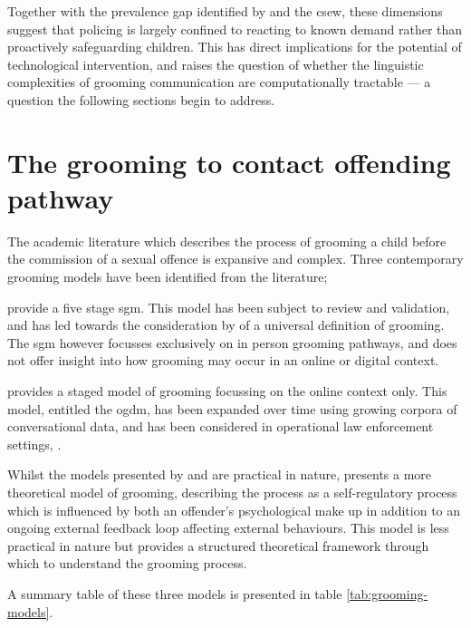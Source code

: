\documentclass[12pt,a4paper,oneside]{report}
\begin{document}
Together with the prevalence gap identified by \citet{finkelhor2024prevalence} and the \gls{csew}, these dimensions suggest that policing is largely confined to reacting to known demand rather than proactively safeguarding children. This has direct implications for the potential of technological intervention, and raises the question of whether the linguistic complexities of grooming communication are computationally tractable — a question the following sections begin to address.

\section{The grooming to contact offending pathway}
\label{sec:the-grooming-to-contact-offending-pathway}
The academic literature which describes the process of grooming a child before the commission of a sexual offence is expansive and complex.  Three contemporary grooming models have been identified from the literature;

\citet{winters2017stages} provide a five stage \gls{sgm}.  This model has been subject to review and validation, \citep{winters2020validation} and has led towards the consideration by \citet{winters2022universal} of a universal definition of grooming.  The \gls{sgm} however focusses exclusively on in person grooming pathways, and does not offer insight into how grooming may occur in an online or digital context.  

\citet{lorenzo-dus2016understanding} provides a staged model of grooming focussing on the online context only.  This model, entitled the \gls{ogdm}, has been expanded over time using growing corpora of conversational data, \citep{lorenzo-dus2017cause,lorenzo-dus2019your,lorenzo-dus2020communicative} and has been considered in operational law enforcement settings, \citet{swansea2023dragon}.

Whilst the models presented by \citet{winters2017stages} and \citet{lorenzo-dus2016understanding} are practical in nature, \citet{elliott2017selfregulation} presents a more theoretical model of grooming, describing the process as a self-regulatory process which is influenced by both an offender's psychological make up in addition to an ongoing external feedback loop affecting external behaviours.  This model is less practical in nature but provides a structured theoretical framework through which to understand the grooming process.

A summary table of these three models is presented in table \ref{tab:grooming-models}.
\end{document}
